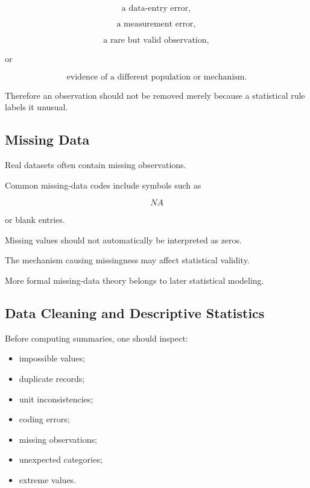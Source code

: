 \[
\boxed{
\text{a data-entry error},
}
\]

\[
\boxed{
\text{a measurement error},
}
\]

\[
\boxed{
\text{a rare but valid observation},
}
\]

or

\[
\boxed{
\text{evidence of a different population or mechanism}.
}
\]

Therefore an observation should not be removed merely because a
statistical rule labels it unusual.

\subsection{Missing Data}
\label{subsec:missing-data-descriptive}

Real datasets often contain missing observations.

Common missing-data codes include symbols such as

\[
NA
\]

or blank entries.

Missing values should not automatically be interpreted as zeros.

The mechanism causing missingness may affect statistical validity.

More formal missing-data theory belongs to later statistical modeling.

\subsection{Data Cleaning and Descriptive Statistics}
\label{subsec:data-cleaning-descriptive}

Before computing summaries, one should inspect:

\begin{itemize}
    \item impossible values;
    \item duplicate records;
    \item unit inconsistencies;
    \item coding errors;
    \item missing observations;
    \item unexpected categories;
    \item extreme values.
\end{itemize}

